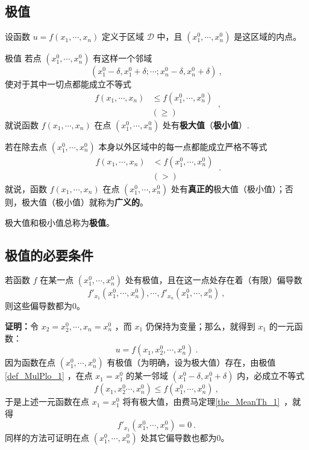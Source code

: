 
\subsection{极值}
设函数 $u=f(x_1,\cdots,x_n)$ 定义于区域 $\mathcal{D}$ 中，且 $(x_1^0,\cdots,x_n^0)$ 是这区域的内点。

\begin{definition}{极值}\label{def_MulPlo_1}
若点 $(x_1^0,\cdots,x_n^0)$ 有这样一个邻域
\[(x_1^0-\delta,x_1^0+\delta;\cdots;x_n^0-\delta,x_n^0+\delta)~,\]
使对于其中一切点都能成立不等式
\begin{equation}
\begin{aligned}
f(x_1,\cdots,x_n)&\leq f(x_1^0,\cdots,x_n^0)\\
&(\geq)
\end{aligned}~,
\end{equation}
就说函数 $f(x_1,\cdots,x_n)$ 在点 $(x_1^0,\cdots,x_n^0)$ 处有\textbf{极大值}（\textbf{极小值}）.

若在除去点 $(x_1^0,\cdots,x_n^0)$ 本身以外区域中的每一点都能成立严格不等式
\begin{equation}
\begin{aligned}
f(x_1,\cdots,x_n)&< f(x_1^0,\cdots,x_n^0)\\
&(>)
\end{aligned}~.
\end{equation}
就说，函数 $f(x_1,\cdots,x_n)$ 在点 $(x_1^0,\cdots,x_n^0)$ 处有\textbf{真正的}极大值（极小值）；否则，极大值（极小值）就称为\textbf{广义的}。

极大值和极小值总称为\textbf{极值}。
\end{definition}
\subsection{极值的必要条件}
\begin{theorem}{}
若函数 $f$ 在某一点 $(x_1^0,\cdots,x_n^0)$ 处有极值，且在这一点处存在着（有限）偏导数
\[f'_{x_1}(x_1^0,\cdots,x_n^0),\cdots,f'_{x_n}(x_1^0,\cdots,x_n^0)~,\]
则这些偏导数都为0。
\end{theorem}
\textbf{证明：}令 $x_2=x_2^0,\cdots,x_n=x_n^0$ ，而 $x_1$ 仍保持为变量；那么，就得到 $x_1$ 的一元函数：
\begin{equation}
u=f(x_1,x_2^0,\cdots,x_n^0)~.
\end{equation}
因为函数在点 $(x_1^0,\cdots,x_n^0)$ 有极值（为明确，设为极大值）存在，由极值\autoref{def_MulPlo_1} ，在点 $x_1=x_1^0$ 的某一邻域 $(x_1^0-\delta,x_1^0+\delta)$ 内，必成立不等式
\begin{equation}
f(x_1,x_2^0\cdots,x_n^0)\leq f(x_1^0,\cdots,x_n^0)~,
\end{equation}
于是上述一元函数在点 $x_1=x_1^0$ 将有极大值，由费马定理\autoref{the_MeanTh_1}~，就得
\begin{equation}
f'_{x_1}(x_1^0,\cdots,x_n^0)=0~.
\end{equation}
同样的方法可证明在点 $(x_1^0,\cdots,x_n^0)$ 处其它偏导数也都为0。

